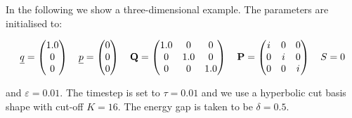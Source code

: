 In the following we show a three-dimensional example. The parameters are initialised to:

\begin{align*}
  \underline{q} = \begin{pmatrix}
              1.0 \\ 0 \\ 0
            \end{pmatrix}
  \quad
  \underline{p} = \begin{pmatrix}
              0 \\ 0 \\ 0
            \end{pmatrix}
  \quad
  \mathbf{Q} = \begin{pmatrix}
              1.0 & 0 & 0 \\ 0 & 1.0 & 0 \\ 0 & 0 & 1.0
            \end{pmatrix}
  \quad
  \mathbf{P} = \begin{pmatrix}
              i & 0 & 0 \\ 0 & i & 0 \\ 0 & 0 & i
            \end{pmatrix}
  \quad
  S = 0
\end{align*}

and $\varepsilon = 0.01$. The timestep is set to $\tau = 0.01$ and we use a hyperbolic cut
basis shape with cut-off $K = 16$. The energy gap is taken to be $\delta = 0.5$.

